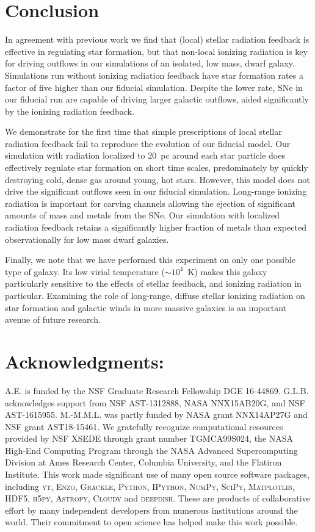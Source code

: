 \section{Conclusion}  \label{ch2:sec:conclusion}
In agreement with previous work we find that (local) stellar radiation feedback is effective in regulating star formation, but that non-local ionizing radiation is key for driving outflows in our simulations of an isolated, low mass, dwarf galaxy. Simulations run without ionizing radiation feedback have star formation rates a factor of five higher than our fiducial simulation. Despite the lower rate, SNe in our fiducial run are capable of driving larger galactic outflows, aided significantly by the ionizing radiation feedback.

We demonstrate for the first time that simple prescriptions of local stellar radiation feedback fail to reproduce the evolution of our fiducial model. Our simulation with radiation localized to 20~pc around each star particle does effectively regulate star formation on short time scales, predominately by quickly destroying cold, dense gas around young, hot stars. However, this model does not drive the significant outflows seen in our fiducial simulation. Long-range ionizing radiation is important for carving channels allowing the ejection of significant amounts of mass and metals from the SNe. Our simulation with localized radiation feedback retains a significantly higher fraction of metals than expected observationally for low mass dwarf galaxies.

Finally, we note that we have performed this experiment on only one possible type of galaxy. Its low virial temperature ($\sim10^{4}$~K) makes this galaxy particularly sensitive to the effects of stellar feedback, and ionizing radiation in particular. Examining the role of long-range, diffuse stellar ionizing radiation on star formation and galactic winds in more massive galaxies is an important avenue of future research.

\section*{Acknowledgments:}
A.E. is funded by the NSF Graduate Research Fellowship DGE 16-44869. G.L.B. acknowledges support from NSF AST-1312888, NASA NNX15AB20G, and NSF AST-1615955. M.-M.M.L. was partly funded by NASA  grant NNX14AP27G and NSF grant AST18-15461. We gratefully recognize computational resources provided by NSF XSEDE through grant number TGMCA99S024, the NASA High-End Computing Program through the NASA Advanced Supercomputing Division at Ames Research Center, Columbia University, and the Flatiron Institute. This work made significant use of many open source software packages, including \textsc{yt}, \textsc{Enzo}, \textsc{Grackle}, \textsc{Python}, \textsc{IPython}, \textsc{NumPy}, \textsc{SciPy}, \textsc{Matplotlib}, \textsc{HDF5}, \textsc{h5py}, \textsc{Astropy}, \textsc{Cloudy} and \textsc{deepdish}. These are products of collaborative effort by many independent developers from numerous institutions around the world. Their commitment to open science has helped make this work possible.

